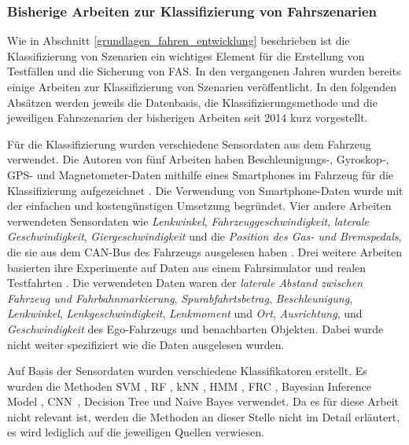 \subsubsection{Bisherige Arbeiten zur Klassifizierung von Fahrszenarien}

Wie in Abschnitt \ref{grundlagen_fahren_entwicklung} beschrieben ist die Klassifizierung von Szenarien ein wichtiges Element für die Erstellung von Testfällen und die Sicherung von \ac{FAS}. In den vergangenen Jahren wurden bereits einige Arbeiten zur Klassifizierung von Szenarien veröffentlicht. In den folgenden Absätzen werden jeweils die Datenbasis, die Klassifizierungsmethode und die jeweiligen Fahrszenarien der bisherigen Arbeiten seit 2014 kurz vorgestellt.

Für die Klassifizierung wurden verschiedene Sensordaten aus dem Fahrzeug verwendet. Die Autoren von fünf Arbeiten haben Beschleunigungs-, Gyroskop-, GPS- und Magnetometer-Daten mithilfe eines Smartphones im Fahrzeug für die Klassifizierung aufgezeichnet \cite{xie2018driving, cervantes2016vehicle, woo2016manoeuvre, camlica2016feature, arroyo2016adaptive}. Die Verwendung von Smartphone-Daten wurde mit der einfachen und kostengünstigen Umsetzung begründet. Vier andere Arbeiten verwendeten Sensordaten wie \textit{Lenkwinkel}, \textit{Fahrzeuggeschwindigkeit}, \textit{laterale Geschwindigkeit}, \textit{Giergeschwindigkeit} und die \textit{Position des Gas- und Bremspedals}, die sie aus dem CAN-Bus des Fahrzeugs ausgelesen haben \cite{zheng2017lane, zheng2015non, li2015lane, zheng2014threshold}. Drei weitere Arbeiten basierten ihre Experimente auf Daten aus einem Fahrsimulator \cite{sun2017robust, zheng2016drivers} und realen Testfahrten \cite{gruner2017spatiotemporal}. Die verwendeten Daten waren der \textit{laterale Abstand zwischen Fahrzeug und Fahrbahnmarkierung}, \textit{Spurabfahrtsbetrag}, \textit{Beschleunigung}, \textit{Lenkwinkel}, \textit{Lenkgeschwindigkeit}, \textit{Lenkmoment} und \textit{Ort}, \textit{Ausrichtung}, und \textit{Geschwindigkeit} des Ego-Fahrzeugs und benachbarten Objekten. Dabei wurde nicht weiter spezifiziert wie die Daten ausgelesen wurden.

Auf Basis der Sensordaten wurden verschiedene Klassifikatoren erstellt. Es wurden die Methoden \ac{SVM} \cite{sun2017robust, cervantes2016vehicle, woo2016manoeuvre, camlica2016feature, zheng2016drivers, zheng2015non}, \ac{RF} \cite{xie2018driving, cervantes2016vehicle, zheng2016drivers}, \ac{kNN} \cite{zheng2017lane, camlica2016feature, zheng2016drivers}, \ac{HMM} \cite{zheng2017lane, li2015lane}, \ac{FRC} \cite{cervantes2016vehicle, arroyo2016adaptive}, Bayesian Inference Model \cite{sun2017robust}, \ac{CNN} \cite{gruner2017spatiotemporal}, Decision Tree \cite{zheng2014threshold} und Naive Bayes \cite{camlica2016feature} verwendet. Da es für diese Arbeit nicht relevant ist, werden die Methoden an dieser Stelle nicht im Detail erläutert, es wird lediglich auf die jeweiligen Quellen verwiesen.

